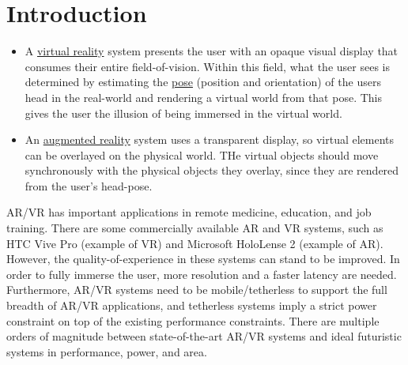 \section{Introduction}

\begin{itemize}
\item A \underline{virtual reality} system presents the user with an opaque visual display that consumes their entire {field-of-vision}. Within this field, what the user sees is determined by estimating the \underline{pose} (position and orientation) of the users head in the real-world and {rendering} a virtual world from that pose. This gives the user the illusion of being immersed in the virtual world.

\item An \underline{augmented reality} system uses a transparent display, so virtual elements can be overlayed on the physical world. THe virtual objects should move synchronously with the physical objects they overlay, since they are rendered from the user's head-pose.



\end{itemize}

AR/VR has important applications in remote medicine, education, and job training. There are some commercially available AR and VR systems, such as HTC Vive Pro (example of VR) and Microsoft HoloLense 2 (example of AR). However, the {quality-of-experience} in these systems can stand to be improved. In order to fully immerse the user, more resolution and a faster latency are needed. Furthermore, AR/VR systems need to be mobile/tetherless to support the full breadth of AR/VR applications, and tetherless systems imply a strict power constraint on top of the existing performance constraints. There are multiple orders of magnitude between state-of-the-art AR/VR systems and ideal futuristic systems in performance, power, and area.

